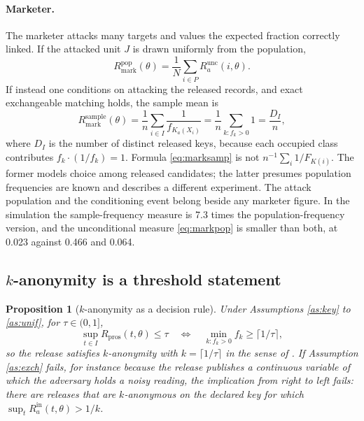 \documentclass[11pt,a4paper]{article}
\theoremstyle{plain}
\newtheorem{proposition}{Proposition}
\theoremstyle{definition}
\theoremstyle{definition}
\theoremstyle{plain}
\begin{document}
\paragraph{Marketer.}
The marketer attacks many targets and values the expected fraction correctly
linked. If the attacked unit $J$ is drawn uniformly from the population,
\begin{equation}
R_{\mathrm{mark}}^{\mathrm{pop}}(\theta) = \frac{1}{N}\sum_{i \in P}
R_a^{\mathrm{unc}}(i, \theta) .
\label{eq:markpop}
\end{equation}
If instead one conditions on attacking the released records, and exact
exchangeable matching holds, the sample mean is
\begin{equation}
R_{\mathrm{mark}}^{\mathrm{sample}}(\theta)
= \frac{1}{n}\sum_{i \in I}\frac{1}{f_{K_a(X_i)}}
= \frac{1}{n}\sum_{k : f_k > 0} 1
= \frac{D_I}{n} ,
\label{eq:marksamp}
\end{equation}
where $D_I$ is the number of distinct released keys, because each occupied
class contributes $f_k \cdot (1/f_k) = 1$. Formula \eqref{eq:marksamp} is not
$n^{-1}\sum_i 1/F_{K(i)}$. The former models choice among released candidates;
the latter presumes population frequencies are known and describes a different
experiment. The attack population and the conditioning event belong beside any
marketer figure. In the simulation the sample-frequency
measure is 7.3 times the population-frequency version, and the unconditional
measure \eqref{eq:markpop} is smaller than both, at 0.023 against 0.466 and
0.064.

\subsection{$k$-anonymity is a threshold statement}

\begin{proposition}[$k$-anonymity as a decision rule]\label{prop:kanon}
Under Assumptions \ref{as:key} to \ref{as:unif}, for $\tau \in (0,1]$,
\begin{equation}
\sup_{t \in I} R_{\mathrm{pros}}(t, \theta) \leq \tau
\quad \Longleftrightarrow \quad
\min_{k : f_k > 0} f_k \geq \lceil 1/\tau \rceil ,
\end{equation}
so the release satisfies $k$-anonymity with $k = \lceil 1/\tau \rceil$ in the
sense of \citet{sweeney2002}. If Assumption \ref{as:exch} fails, for instance
because the release publishes a continuous variable of which the adversary holds
a noisy reading, the implication from right to left fails: there are releases
that are $k$-anonymous on the declared key for which
$\sup_t R_a^{\mathrm{in}}(t,\theta) > 1/k$.
\end{proposition}
\end{document}
